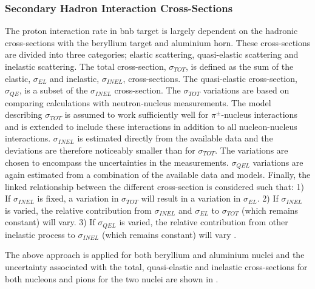 \subsubsection*{Secondary Hadron Interaction Cross-Sections}
The proton interaction rate in \gls{bnb} target is largely dependent on the hadronic cross-sections with the beryllium target and aluminium horn. These cross-sections are divided into three categories; elastic scattering, quasi-elastic scattering and inelastic scattering. The total cross-section, $\sigma_{TOT}$, is defined as the sum of the elastic, $\sigma_{EL}$ and inelastic, $\sigma_{INEL}$, cross-sections. The quasi-elastic cross-section, $\sigma_{QE}$, is a subset of the  $\sigma_{INEL}$ cross-section. The $\sigma_{TOT}$ variations are based on comparing calculations with neutron-nucleus measurements. The model describing $\sigma_{TOT}$ is assumed to work sufficiently well for $\pi^{\pm}$-nucleus interactions and is extended to include these interactions in addition to all nucleon-nucleus interactions. $\sigma_{INEL}$ is estimated directly from the available data and the deviations are therefore noticeably smaller than for $\sigma_{TOT}$. The variations are chosen to encompass the uncertainties in the measurements. $\sigma_{QEL}$ variations are again estimated from a combination of the available data and models. Finally, the linked relationship between the different cross-section is considered such that: 1) If  $\sigma_{INEL}$ is fixed, a variation in $\sigma_{TOT}$ will result in a variation in $\sigma_{EL}$. 2) If $\sigma_{INEL}$ is varied, the relative contribution from $\sigma_{INEL}$ and $\sigma_{EL}$ to  $\sigma_{TOT}$ (which remains constant) will vary. 3) If $\sigma_{QEL}$ is varied, the relative contribution from other inelastic process to $\sigma_{INEL}$ (which remains constant) will vary \cite{BNB_flux}.

The above approach is applied for both beryllium and aluminium nuclei and the uncertainty associated with the total, quasi-elastic and inelastic cross-sections for both nucleons and pions for the two nuclei are shown in .

